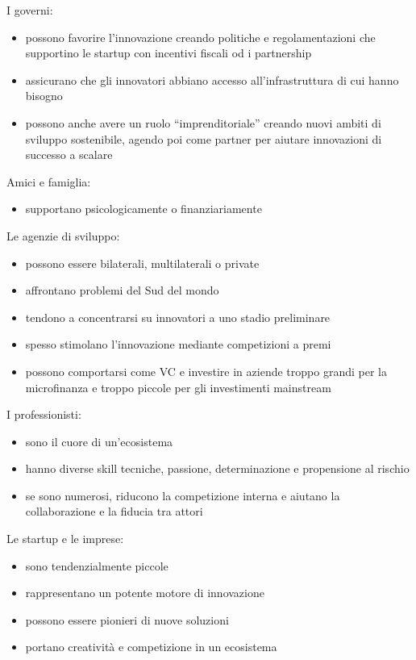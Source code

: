 \documentclass[answers, a4paper, 11pt]{exam}
\begin{document}
I governi:

\begin{itemize}
    \item possono favorire l'innovazione creando politiche e regolamentazioni che supportino le startup con incentivi fiscali od i partnership
    \item assicurano che gli innovatori abbiano accesso all'infrastruttura di cui hanno bisogno
    \item possono anche avere un ruolo ``imprenditoriale'' creando nuovi ambiti di sviluppo sostenibile, agendo poi come partner per aiutare innovazioni di successo a scalare
\end{itemize}

Amici e famiglia:

\begin{itemize}
    \item supportano psicologicamente o finanziariamente
\end{itemize}

Le agenzie di sviluppo:

\begin{itemize}
    \item possono essere bilaterali, multilaterali o private
    \item affrontano problemi del Sud del mondo
    \item tendono a concentrarsi su innovatori a uno stadio preliminare
    \item spesso stimolano l'innovazione mediante competizioni a premi
    \item possono comportarsi come VC e investire in aziende troppo grandi per la microfinanza e troppo piccole per gli investimenti mainstream
\end{itemize}

I professionisti:

\begin{itemize}
    \item sono il cuore di un'ecosistema
    \item hanno diverse skill tecniche, passione, determinazione e propensione al rischio
    \item se sono numerosi, riducono la competizione interna e aiutano la collaborazione e la fiducia tra attori
\end{itemize}

Le startup e le imprese:

\begin{itemize}
    \item sono tendenzialmente piccole
    \item rappresentano un potente motore di innovazione
    \item possono essere pionieri di nuove soluzioni
    \item portano creatività e competizione in un ecosistema
\end{itemize}
\end{document}
